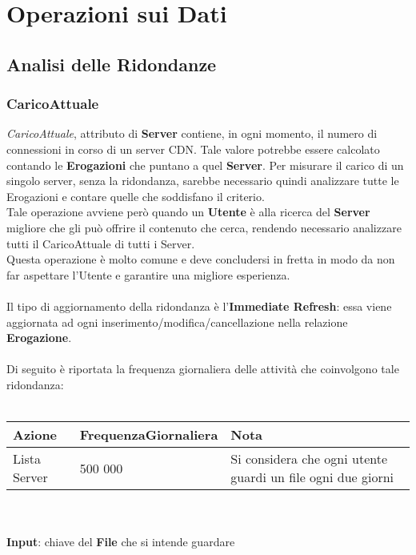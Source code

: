 \documentclass{article}
\begin{document}
\section{Operazioni sui Dati}
\subsection{Analisi delle Ridondanze}
\subsubsection{CaricoAttuale}
\textit{CaricoAttuale}, attributo di \textbf{Server} contiene, in ogni momento, il numero di connessioni in corso di un server CDN. Tale valore potrebbe essere calcolato contando le \textbf{Erogazioni} che puntano a quel \textbf{Server}. Per misurare il carico di un singolo server, senza la ridondanza, sarebbe necessario quindi analizzare tutte le Erogazioni e contare quelle che soddisfano il criterio. \\
Tale operazione avviene però quando un \textbf{Utente} è alla ricerca del \textbf{Server} migliore che gli può offrire il contenuto che cerca, rendendo necessario analizzare tutti il CaricoAttuale di tutti i Server.\\
Questa operazione è molto comune e deve concludersi in fretta in modo da non far aspettare l'Utente e garantire una migliore esperienza.
\\ \\ 
Il tipo di aggiornamento della ridondanza è l'\textbf{Immediate Refresh}: essa viene aggiornata ad ogni inserimento/modifica/cancellazione nella relazione \textbf{Erogazione}.
\\ \\
%
%
%
%
%
%
%
%
Di seguito è riportata la frequenza giornaliera delle attività che coinvolgono tale ridondanza: \\ \\
\begin{tabular}{|C{2.2cm}|C{3.8cm}|C{4.4cm}|}
\hline
    \textbf{Azione} & \textbf{FrequenzaGiornaliera} & \textbf{Nota} \\
\hline
Lista Server & 500 000 & Si considera che ogni utente guardi un file ogni due giorni \\
\hline
\end{tabular}
\\ \\ 
\textbf{Input}: chiave del \textbf{File} che si intende guardare \\
\end{document}
